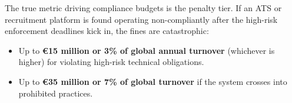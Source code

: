 \documentclass[a4paper, 12pt]{article}
\begin{document}
The true metric driving compliance budgets is the penalty tier. If an ATS or recruitment platform is found operating non-compliantly after the high-risk enforcement deadlines kick in, the fines are catastrophic:

\begin{itemize}
    \item
    Up to \textbf{€15 million or 3\% of global annual turnover} (whichever is higher) for violating high-risk technical obligations.

    \item 
    Up to \textbf{€35 million or 7\% of global turnover} if the system crosses into prohibited practices.

\end{itemize}

\newpage
\end{document}
